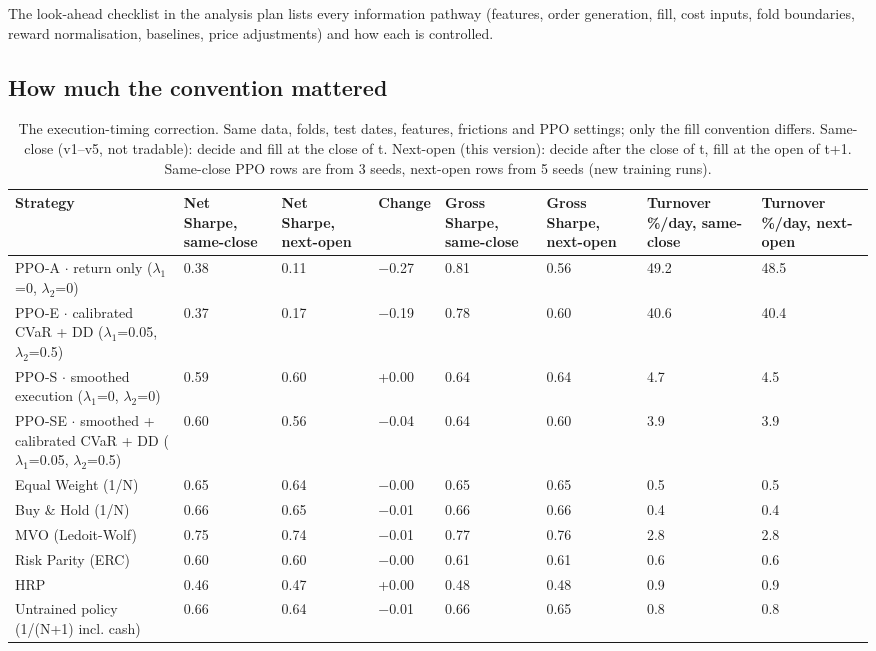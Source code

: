 \documentclass[11pt]{article}
\begin{document}
The look-ahead checklist in the analysis plan lists every information pathway (features, order generation, fill, cost inputs, fold boundaries, reward normalisation, baselines, price adjustments) and how each is controlled.

\subsection{How much the convention mattered}\label{how-much-the-convention-mattered}

\begin{table}[!htbp]
\centering\scriptsize
\caption{The execution-timing correction. Same data, folds, test dates, features, frictions and PPO settings; only the fill convention differs. Same-close (v1--v5, not tradable): decide and fill at the close of t. Next-open (this version): decide after the close of t, fill at the open of t+1. Same-close PPO rows are from 3 seeds, next-open rows from 5 seeds (new training runs).\label{tab-legacy-no}}
\begin{adjustbox}{max width=\linewidth}
\begin{tabular}{@{}llllllll@{}}
\toprule
Strategy & Net Sharpe, same-close & Net Sharpe, next-open & Change & Gross Sharpe, same-close & Gross Sharpe, next-open & Turnover \%/day, same-close & Turnover \%/day, next-open \\
\midrule
PPO-A $\cdot$ return only {($\lambda_1$=0, $\lambda_2$=0)} & 0.38 & 0.11 & $-$0.27 & 0.81 & 0.56 & 49.2 & 48.5 \\
PPO-E $\cdot$ calibrated CVaR + DD {($\lambda_1$=0.05, $\lambda_2$=0.5)} & 0.37 & 0.17 & $-$0.19 & 0.78 & 0.60 & 40.6 & 40.4 \\
PPO-S $\cdot$ smoothed execution {($\lambda_1$=0, $\lambda_2$=0)} & 0.59 & 0.60 & +0.00 & 0.64 & 0.64 & 4.7 & 4.5 \\
PPO-SE $\cdot$ smoothed + calibrated CVaR + DD {($\lambda_1$=0.05, $\lambda_2$=0.5)} & 0.60 & 0.56 & $-$0.04 & 0.64 & 0.60 & 3.9 & 3.9 \\
Equal Weight (1/N) & 0.65 & 0.64 & $-$0.00 & 0.65 & 0.65 & 0.5 & 0.5 \\
Buy \& Hold (1/N) & 0.66 & 0.65 & $-$0.01 & 0.66 & 0.66 & 0.4 & 0.4 \\
MVO (Ledoit-Wolf) & 0.75 & 0.74 & $-$0.01 & 0.77 & 0.76 & 2.8 & 2.8 \\
Risk Parity (ERC) & 0.60 & 0.60 & $-$0.00 & 0.61 & 0.61 & 0.6 & 0.6 \\
HRP & 0.46 & 0.47 & +0.00 & 0.48 & 0.48 & 0.9 & 0.9 \\
Untrained policy (1/(N+1) incl. cash) & 0.66 & 0.64 & $-$0.01 & 0.66 & 0.65 & 0.8 & 0.8 \\
\bottomrule
\end{tabular}
\end{adjustbox}
\end{table}
\end{document}

